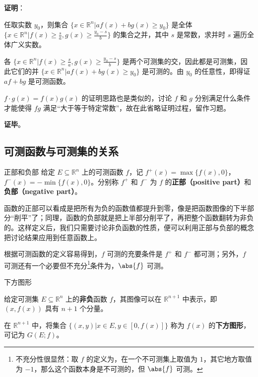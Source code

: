 \textbf{证明}：

任取实数 $y_0$，则集合 $\{x\in\mathbb{R}^n|af(x)+bg(x)\geq y_0\}$ 是全体 $\{x\in\mathbb{R}^n|f(x)\geq \frac{s}{a}, g(x)\geq \frac{y_0-s}{b}\}$ 的集合之并，其中 $s$ 是常数，求并时 $s$ 遍历全体广义实数。

各 $\{x\in\mathbb{R}^n|f(x)\geq \frac{s}{a}, g(x)\geq \frac{y_0-s}{b}\}$ 是两个可测集的交，因此都是可测集，因此它们的并 $\{x\in\mathbb{R}^n|af(x)+bg(x)\geq y_0\}$ 是可测的。由 $y_0$ 的任意性，即得证 $af+bg$ 是可测函数。

$f\cdot g(x)=f(x)g(x)$ 的证明思路也是类似的，讨论 $f$ 和 $g$ 分别满足什么条件才能使得 $fg$ 满足“大于等于特定常数”，故在此省略证明过程，留作习题。


\textbf{证毕}。




\subsection{可测函数与可测集的关系}




\begin{definition}{正部和负部}
给定 $E\subseteq\mathbb{R}^n$ 上的可测函数 $f$，记 $f^+(x)=\max\{f(x), 0\}$，$f^-(x)=-\min\{f(x), 0\}$。分别称 $f^+$ 和 $f^-$ 为 $f$ 的\textbf{正部（positive part）}和\textbf{负部（negative part）}。
\end{definition}

函数的正部可以看成是把所有为负的函数值都提升到零，像是把函数图像的下半部分“削平”了；同理，函数的负部就是把上半部分削平了，再把整个函数翻转为非负的。这样定义后，我们只需要讨论非负函数的性质，便可以利用正部与负部的概念把讨论结果应用到任意函数上。

根据可测函数的定义容易得到，$f$ 可测的充要条件是 $f^+$ 和 $f^-$ 都可测；另外，$f$ 可测还有一个必要但不充分\footnote{不充分性很显然：取 $f$ 的定义为，在一个不可测集上取值为 $1$，其它地方取值为 $-1$，那么这个函数本身是不可测的，但 $\abs{f}$ 可测。}条件为，$\abs{f}$ 可测。

\begin{definition}{下方图形}\label{MsbFun_def2}

给定可测集 $E\subseteq\mathbb{R}^n$ 上的\textbf{非负}函数 $f$，其图像可以在 $\mathbb{R}^{n+1}$ 中表示，即 $(x, f(x))$ 具有 $n+1$ 个分量。

在 $\mathbb{R}^{n+1}$ 中，将集合 $\{(x, y)|x\in E, y\in [0, f(x)]\}$ 称为 $f(x)$ 的\textbf{下方图形}，可记为 $G(E; f)$。

\end{definition}

